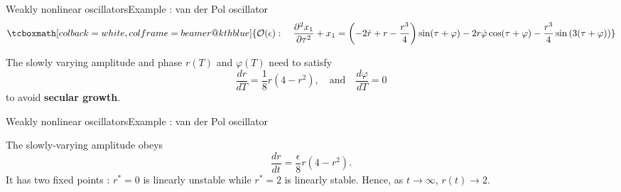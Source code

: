 \documentclass[usenames,dvipsnames,svgnames,10pt,aspectratio=169]{beamer}
\begin{document}
\begin{frame}[t, c]{Weakly nonlinear oscillators}{Example : van der Pol oscillator}
  \[
  \tcboxmath[colback=white, colframe=beamer@kthblue]{
    \mathcal{O}(\epsilon) : \quad \dfrac{\partial^2 x_1}{\partial \tau^2} + x_1 = \left( -2 \dot{r} + r - \dfrac{r^3}{4} \right) \sin(\tau + \varphi) - 2 r \dot{\varphi} \cos(\tau + \varphi) - \dfrac{r^3}{4} \sin\left( 3(\tau + \varphi) \right)
  }
  \]

  \bigskip

  The slowly varying amplitude and phase $r(T)$ and $\varphi(T)$ need to satisfy
  \[
  \dfrac{dr}{dT} = \dfrac{1}{8} r \left( 4 - r^2 \right), \quad \text{and} \quad \dfrac{d \varphi}{dT} = 0
  \]
  to avoid \alert{\textbf{secular growth}}.

\end{frame}




\begin{frame}[t, c]{Weakly nonlinear oscillators}{Example : van der Pol oscillator}
  \begin{minipage}{.58\textwidth}
    The slowly-varying amplitude obeys
    \[
    \dfrac{dr}{dt} = \dfrac{\epsilon}{8} r \left( 4 - r^2 \right).
    \]
    It has two fixed points : $r^* = 0$ is linearly unstable while $r^* = 2$ is linearly stable.
    Hence, as $t \to \infty$, $r(t) \to 2$.
  \end{minipage}%
  \hfill
  \begin{minipage}{.38\textwidth}
    \centering
  \end{minipage}
\end{frame}
\end{document}
